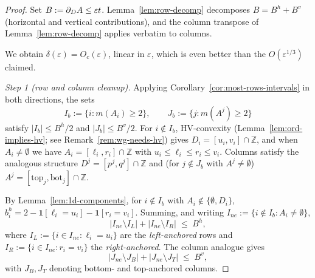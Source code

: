 \begin{proof}
Set $B:=\partial_D A\le\varepsilon t$. Lemma~\ref{lem:row-decomp} decomposes
$B=B^h+B^v$ (horizontal and vertical contributions), and the column transpose of
Lemma~\ref{lem:row-decomp} applies verbatim to columns.

We obtain $\delta(\varepsilon)=O_c(\varepsilon)$, linear in $\varepsilon$, which is
even better than the $O(\varepsilon^{1/3})$ claimed.

\medskip\noindent\emph{Step 1 (row and column cleanup).}
Applying Corollary~\ref{cor:most-rows-intervals} in both directions, the sets
\[
I_b:=\{i:m(A_i)\ge 2\},\qquad J_b:=\{j:m(A^j)\ge 2\}
\]
satisfy $|I_b|\le B^h/2$ and $|J_b|\le B^v/2$. For $i\notin I_b$, HV-convexity
(Lemma~\ref{lem:ord-implies-hv}; see Remark~\ref{rem:wg-needs-hv})
gives $D_i=[u_i,v_i]\cap\mathbb Z$, and when $A_i\ne\emptyset$ we have
$A_i=[\ell_i,r_i]\cap\mathbb Z$ with $u_i\le\ell_i\le r_i\le v_i$. Columns
satisfy the analogous structure $D^j=[p^j,q^j]\cap\mathbb Z$ and (for
$j\notin J_b$ with $A^j\ne\emptyset$) $A^j=[\mathrm{top}_j,\mathrm{bot}_j]\cap\mathbb Z$.

By Lemma~\ref{lem:1d-components}, for $i\notin I_b$ with $A_i\notin\{\emptyset,D_i\}$,
\(
b_i^h=2-\mathbf 1[\ell_i=u_i]-\mathbf 1[r_i=v_i].
\)
Summing, and writing $I_{ne}:=\{i\notin I_b:A_i\ne\emptyset\}$,
\begin{equation}\label{eq:wg-anchor-row}
|I_{ne}\setminus I_L|+|I_{ne}\setminus I_R|\;\le\;B^h,
\end{equation}
where $I_L:=\{i\in I_{ne}:\ell_i=u_i\}$ are the \emph{left-anchored} rows and
$I_R:=\{i\in I_{ne}:r_i=v_i\}$ the \emph{right-anchored}. The column analogue gives
\begin{equation}\label{eq:wg-anchor-col}
|J_{ne}\setminus J_B|+|J_{ne}\setminus J_T|\;\le\;B^v,
\end{equation}
with $J_B,J_T$ denoting bottom- and top-anchored columns.


\end{proof}
